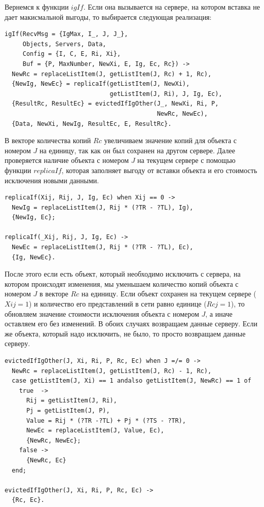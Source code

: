 			Вернемся к функции $igIf$. Если она вызывается на сервере, на котором вставка не дает макисмальной выгоды, то выбирается следующая реализация:
			\begin{lstlisting}
igIf(RecvMsg = {IgMax, I_, J, J_}, 
     Objects, Servers, Data,
     Config = {I, C, E, Ri, Xi},
     Buf = {P, MaxNumber, NewXi, E, Ig, Ec, Rc}) ->
  NewRc = replaceListItem(J, getListItem(J, Rc) + 1, Rc),
  {NewIg, NewEc} = replicaIf(getListItem(J, NewXi), 
                             getListItem(J, Ri), J, Ig, Ec),
  {ResultRc, ResultEc} = evictedIfIgOther(J_, NewXi, Ri, P, 
                                          NewRc, NewEc),
  {Data, NewXi, NewIg, ResultEc, E, ResultRc}.				
			\end{lstlisting}
			В векторе количества копий $Rc$ увеличиваем значение копий для объекта с номером $J$ на единицу, так как он был сохранен на другом сервере. Далее проверяется наличие объекта с 
			номером $J$ на текущем сервере с помощью функции $replicaIf$, которая заполняет выгоду от вставки объекта и его стоимость исключения новыми данными. 
			\begin{lstlisting}
replicaIf(Xij, Rij, J, Ig, Ec) when Xij == 0 -> 
  NewIg = replaceListItem(J, Rij * (?TR - ?TL), Ig),
  {NewIg, Ec};

replicaIf(_Xij, Rij, J, Ig, Ec) ->
  NewEc = replaceListItem(J, Rij * (?TR - ?TL), Ec),
  {Ig, NewEc}.				
			\end{lstlisting}
			После этого если есть объект, который необходимо исключить с сервера, на котором происходят изменения, мы уменьшаем количество копий объекта с номером $J$ в векторе $Rc$ на единицу.
			Если объект сохранен на текущем сервере ($Xij = 1$) и количество его представлений в сети равно единице ($Rcj = 1$), то обновляем значение стоимости исключения объекта с номером $J$,
			а иначе оставляем его без изменений. В обоих случаях возвращаем данные серверу. Если же объекта, который надо исключить, не было, то просто возвращаем данные серверу.
			\begin{lstlisting}
evictedIfIgOther(J, Xi, Ri, P, Rc, Ec) when J =/= 0 ->
  NewRc = replaceListItem(J, getListItem(J, Rc) - 1, Rc),
  case getListItem(J, Xi) == 1 andalso getListItem(J, NewRc) == 1 of
    true  -> 
      Rij = getListItem(J, Ri),
      Pj = getListItem(J, P),
      Value = Rij * (?TR -?TL) + Pj * (?TS - ?TR),
      NewEc = replaceListItem(J, Value, Ec),
      {NewRc, NewEc};
    false -> 
      {NewRc, Ec}
  end;

evictedIfIgOther(J, Xi, Ri, P, Rc, Ec) -> 
  {Rc, Ec}.				
			\end{lstlisting}
